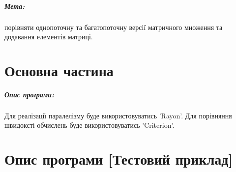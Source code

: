 \documentclass{udstu}
\begin{document}

\tableofcontents

\intro

\paragraph{\textbf{Мета:}} порівняти однопоточну та багатопоточну версії матричного множення та додавання елементів матриці.

\chapter{Основна частина}
\label{chap:1}

\paragraph{\textbf{Опис програми:}}

Для реалізації паралелізму буде використовуватись 'Rayon'.
Для порівняння швидоксті обчислень буде використовуватись 'Criterion'.


\chapter{Опис програми [Тестовий приклад]}
\label{chap:3}
\end{document}
